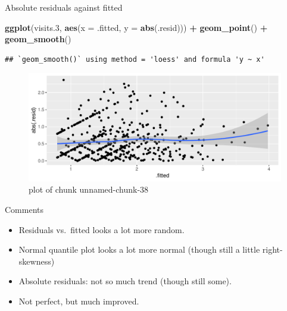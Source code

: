 \documentclass[ignorenonframetext,]{beamer}
\newenvironment{Shaded}{\begin{snugshade}}{\end{snugshade}}
\newcommand{\DataTypeTok}[1]{\textcolor[rgb]{0.13,0.29,0.53}{#1}}
\newcommand{\FloatTok}[1]{\textcolor[rgb]{0.00,0.00,0.81}{#1}}
\newcommand{\KeywordTok}[1]{\textcolor[rgb]{0.13,0.29,0.53}{\textbf{#1}}}
\newcommand{\NormalTok}[1]{#1}
\newcommand{\OperatorTok}[1]{\textcolor[rgb]{0.81,0.36,0.00}{\textbf{#1}}}
\newcommand{\StringTok}[1]{\textcolor[rgb]{0.31,0.60,0.02}{#1}}
\begin{document}
\begin{frame}[fragile]{Absolute residuals against fitted}
\protect\hypertarget{absolute-residuals-against-fitted}{}

\begin{Shaded}
\begin{Highlighting}[]
\KeywordTok{ggplot}\NormalTok{(visits}\FloatTok{.3}\NormalTok{, }\KeywordTok{aes}\NormalTok{(}\DataTypeTok{x =}\NormalTok{ .fitted, }\DataTypeTok{y =} \KeywordTok{abs}\NormalTok{(.resid))) }\OperatorTok{+}
\StringTok{  }\KeywordTok{geom_point}\NormalTok{() }\OperatorTok{+}\StringTok{ }\KeywordTok{geom_smooth}\NormalTok{()}
\end{Highlighting}
\end{Shaded}

\begin{verbatim}
## `geom_smooth()` using method = 'loess' and formula 'y ~ x'
\end{verbatim}

\begin{figure}
\centering
\includegraphics{figure/unnamed-chunk-38-1.pdf}
\caption{plot of chunk unnamed-chunk-38}
\end{figure}

\end{frame}

\begin{frame}{Comments}
\protect\hypertarget{comments-5}{}

\begin{itemize}
\item
  Residuals vs.~fitted looks a lot more random.
\item
  Normal quantile plot looks a lot more normal (though still a little
  right-skewness)
\item
  Absolute residuals: not so much trend (though still some).
\item
  Not perfect, but much improved.
\end{itemize}

\end{frame}
\end{document}

